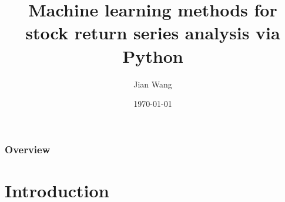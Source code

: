 \documentclass{beamer}
\title[Python for finance]{Machine learning methods for stock return series analysis via Python} %
\author{Jian Wang } %
\institute[Florida state university ] %
{Financial math Ph.D. candidate\\
\vspace{3ex}
Florida state university %
\medskip
\textit{jwang@math.fsu.edu} %
}
\date{\today} %
\begin{document}
\begin{frame}
\titlepage %
\end{frame}

\begin{frame}
\frametitle{Overview} %
\tableofcontents %
\end{frame}


\section{Introduction} %

\end{document}

